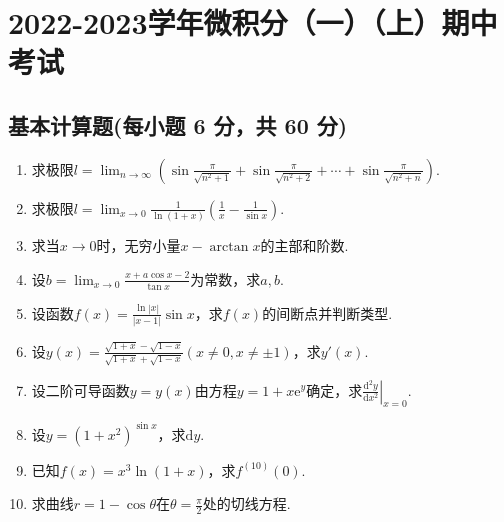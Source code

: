 \documentclass[../Main.tex]{subfiles}
\begin{document}
\chapter{2022-2023学年微积分（一）（上）期中考试}

\section{基本计算题(每小题 6 分，共 60 分)}
\begin{enumerate}
    \item 求极限$l=\lim_{n\to\infty}\left(\sin\frac{\pi}{\sqrt{n^{2}+1}}+\sin\frac{\pi}{\sqrt{n^{2}+2}}
              +\cdots+\sin\frac{\pi}{\sqrt{n^{2}+n}}\right)$.
          \vspace{11em}

    \item 求极限$l=\lim_{x\to0}\frac{1}{\ln(1+x)}\left(\frac{1}{x}-\frac{1}{\sin
                  x}\right)$.
          \vspace{11em}

    \item 求当$x\to 0$时，无穷小量$x-\arctan x$的主部和阶数.
          \vspace{11em}

    \item 设$b=\lim_{x\to0}\frac{x+a\cos x-2}{\tan x}$为常数，求$a,b$.
          \vspace{11em}

    \item 设函数$f(x)=\frac{\ln |x|}{|x-1|}\sin x$，求$f(x)$的间断点并判断类型.
          \vspace{9em}

    \item 设$y(x)=\frac{\sqrt{1+x}-\sqrt{1-x}}{\sqrt{1+x}+\sqrt{1-x}}(x\neq0,x\neq
              \pm1)$，求$y'(x)$.
          \vspace{10em}

    \item 设二阶可导函数$y=y(x)$由方程$y=1+x\mathrm{e}^{y}$确定，求$\left.\frac{\mathrm{d}^{2}
                  y}{\mathrm{d}x^{2}}\right|_{x=0}$.
          \vspace{10em}

    \item 设$y=(1+x^{2})^{\sin x}$，求$\mathrm{d}y$.
          \vspace{10em}

    \item 已知$f(x)=x^{3}\ln(1+x)$，求$f^{(10)}(0)$.
          \vspace{8em}

    \item 求曲线$r=1-\cos \theta$在$\theta=\frac{\pi}{2}$处的切线方程.
          \vspace{8em}
\end{enumerate}
\end{document}
